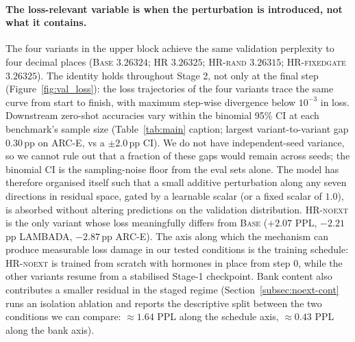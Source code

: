 \paragraph{The loss-relevant variable is when the perturbation is introduced, not what it contains.} The four variants in the upper block achieve the same validation perplexity to four decimal places (\textsc{Base} $3.26324$; \textsc{HR} $3.26325$; \textsc{HR-rand} $3.26315$; \textsc{HR-fixedgate} $3.26325$). The identity holds throughout Stage 2, not only at the final step (Figure~\ref{fig:val_loss}): the loss trajectories of the four variants trace the same curve from start to finish, with maximum step-wise divergence below $10^{-3}$ in loss. Downstream zero-shot accuracies vary within the binomial 95\% CI at each benchmark's sample size (Table~\ref{tab:main} caption; largest variant-to-variant gap $0.30$\,pp on ARC-E, vs a $\pm 2.0$\,pp CI). We do not have independent-seed variance, so we cannot rule out that a fraction of these gaps would remain across seeds; the binomial CI is the sampling-noise floor from the eval sets alone. The model has therefore organised itself such that a small additive perturbation along any seven directions in residual space, gated by a learnable scalar (or a fixed scalar of $1.0$), is absorbed without altering predictions on the validation distribution. \textsc{HR-noext} is the only variant whose loss meaningfully differs from \textsc{Base} ($+2.07$ PPL, $-2.21$\,pp LAMBADA, $-2.87$\,pp ARC-E). The axis along which the mechanism can produce measurable loss damage in our tested conditions is the training schedule: \textsc{HR-noext} is trained from scratch with hormones in place from step $0$, while the other variants resume from a stabilised Stage-1 checkpoint. Bank content also contributes a smaller residual in the staged regime (Section~\ref{subsec:noext-cont} runs an isolation ablation and reports the descriptive split between the two conditions we can compare: $\approx 1.64$ PPL along the schedule axis, $\approx 0.43$ PPL along the bank axis).

